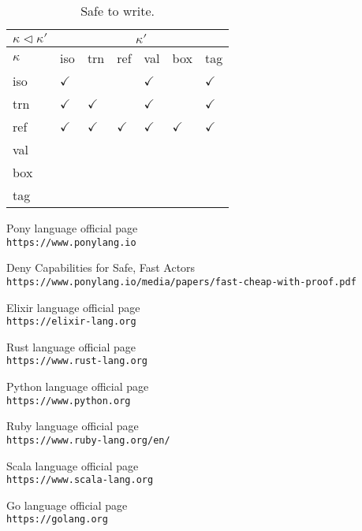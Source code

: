 \documentclass{article}
\begin{document}
\begin{table}[]
\centering
\begin{tabular}{lllllll}
\hline
$\kappa \triangleleft \kappa'$ & \multicolumn{6}{c}{$\kappa'$}             \\ \hline
$\kappa$                 & iso & trn & ref & val & box & tag \\ \hline \hline
iso               & $\checkmark$ &  &  & $\checkmark$ &  & $\checkmark$ \\ \hline
trn               & $\checkmark$ & $\checkmark$ &  & $\checkmark$ &  & $\checkmark$ \\ \hline
ref               & $\checkmark$ & $\checkmark$ & $\checkmark$ & $\checkmark$ & $\checkmark$ & $\checkmark$ \\ \hline
val               &  &  &  &  &  &  \\ \hline
box               &  &  &  &  &  &  \\ \hline
tag               &   &  &  &  &  &     \\ \hline
\end{tabular}
\caption{Safe to write.\cite{type-proof-paper}}
\end{table}


\begin{thebibliography}{9}
Pony language official page
\\\texttt{https://www.ponylang.io}

Deny Capabilities for Safe, Fast Actors
\\\texttt{https://www.ponylang.io/media/papers/fast-cheap-with-proof.pdf}

Elixir language official page
\\\texttt{https://elixir-lang.org}

Rust language official page
\\\texttt{https://www.rust-lang.org}

Python language official page
\\\texttt{https://www.python.org}

Ruby language official page
\\\texttt{https://www.ruby-lang.org/en/}
	
Scala language official page
\\\texttt{https://www.scala-lang.org}

Go language official page
\\\texttt{https://golang.org}
	
	
\end{thebibliography}
\end{document}
